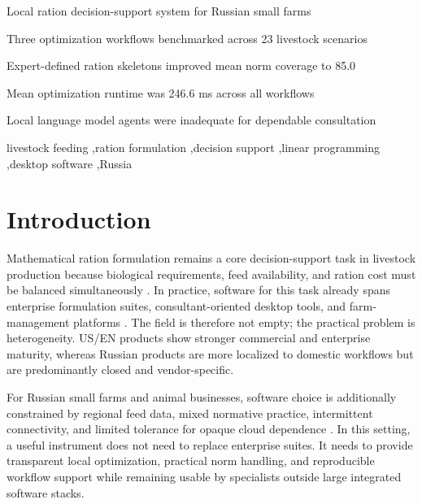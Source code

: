 \documentclass[a4paper,fleqn]{cas-dc}
\begin{document}
\begin{highlights}
\item Local ration decision-support system for Russian small farms
\item Three optimization workflows benchmarked across 23 livestock scenarios
\item Expert-defined ration skeletons improved mean norm coverage to 85.0
\item Mean optimization runtime was 246.6 ms across all workflows
\item Local language model agents were inadequate for dependable consultation
\end{highlights}

\begin{keywords}
livestock feeding \sep ration formulation \sep decision support \sep linear programming \sep desktop software \sep Russia
\end{keywords}

\maketitle

\section{Introduction}\label{sec:introduction}

Mathematical ration formulation remains a core decision-support task in livestock production because biological requirements, feed availability, and ration cost must be balanced simultaneously \citep{nASEM2021, dantzig1963, zhai2020, tedeschi2021smart}. In practice, software for this task already spans enterprise formulation suites, consultant-oriented desktop tools, and farm-management platforms \citep{datacor2026, mixit2026, winfeed2026, korall2026, deltakorm2026, onecow2026, winmix2026}. The field is therefore not empty; the practical problem is heterogeneity. US/EN products show stronger commercial and enterprise maturity, whereas Russian products are more localized to domestic workflows but are predominantly closed and vendor-specific.

For Russian small farms and animal businesses, software choice is additionally constrained by regional feed data, mixed normative practice, intermittent connectivity, and limited tolerance for opaque cloud dependence \citep{kalashnikov2003, vizh2020, aquilani2022, selvaggi2024}. In this setting, a useful instrument does not need to replace enterprise suites. It needs to provide transparent local optimization, practical norm handling, and reproducible workflow support while remaining usable by specialists outside large integrated software stacks.
\end{document}
